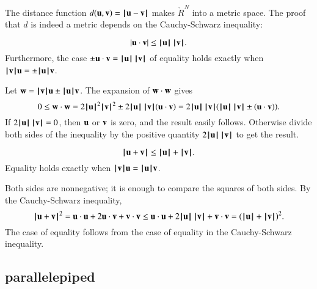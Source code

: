 The distance function $d(\u,\v) = \norm{ \u }{ \v}$ makes
$\ring{R}^N$ into a metric space.  
%
%
%
The proof that $d$ is indeed a metric depends on the Cauchy-Schwarz inequality:


\begin{lemma}
    $$|\u \cdot \v| \le \normo{\u}\,\normo{\v}.$$
Furthermore, the case
$\pm \u\cdot \v = \normo{\u}\,\normo{\v}$  of equality holds exactly when $\normo{\v} \u = \pm\normo{\u} \v$.
\end{lemma}
%

\begin{proved}
   Let $\w = \normo{\v} \u \pm \normo{\u} \v$.  The expansion of $\w\cdot \w$ gives
    $$0\le \w\cdot \w = 2\normo{\u}^2\normo{\v}^2 \pm 2\normo{\u}\, \normo{\v} (\u\cdot \v) =
    2\normo{\u}\,
    \normo{\v} (\normo{\u}\, \normo{\v} \pm (\u \cdot \v)).$$
    If $2\normo{\u} \,\normo{\v} = 0$, then $\u$ or $\v$ is zero, and the result
    easily follows.  Otherwise divide both sides of the inequality
    by the positive quantity $2 \normo{\u} \,\normo{\v}$ to get the result.
\swallowed\end{proved}

\begin{lemma}
  $$
  \normo{\u + \v} \le \normo{\u} + \normo{\v }.
  $$
Equality holds exactly when $\normo{\v}\u = \normo{\u}\v$.
\end{lemma}
%

\begin{proved}
Both sides are nonnegative; it is enough to compare the squares of
both sides.  By the Cauchy-Schwarz inequality,
    $$\normo{\u + \v}^2 = \u\cdot \u + 2 \u\cdot \v + \v\cdot \v \le
      \u\cdot \u + 2 \normo{ \u}\,\normo{\v} + \v\cdot \v = (\normo{\u}+\normo{\v})^2.
    $$
The case of equality follows from the case of equality in the
Cauchy-Schwarz inequality.
\swallowed\end{proved}





\subsection{parallelepiped}\label{sec:piped}
%



